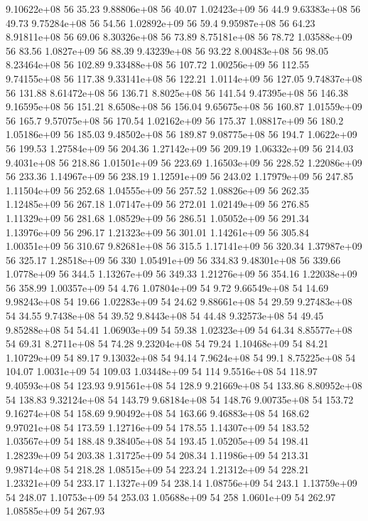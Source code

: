 9.10622e+08 56 35.23
9.88806e+08 56 40.07
1.02423e+09 56 44.9
9.63383e+08 56 49.73
9.75284e+08 56 54.56
1.02892e+09 56 59.4
9.95987e+08 56 64.23
8.91811e+08 56 69.06
8.30326e+08 56 73.89
8.75181e+08 56 78.72
1.03588e+09 56 83.56
1.0827e+09 56 88.39
9.43239e+08 56 93.22
8.00483e+08 56 98.05
8.23464e+08 56 102.89
9.33488e+08 56 107.72
1.00256e+09 56 112.55
9.74155e+08 56 117.38
9.33141e+08 56 122.21
1.0114e+09 56 127.05
9.74837e+08 56 131.88
8.61472e+08 56 136.71
8.8025e+08 56 141.54
9.47395e+08 56 146.38
9.16595e+08 56 151.21
8.6508e+08 56 156.04
9.65675e+08 56 160.87
1.01559e+09 56 165.7
9.57075e+08 56 170.54
1.02162e+09 56 175.37
1.08817e+09 56 180.2
1.05186e+09 56 185.03
9.48502e+08 56 189.87
9.08775e+08 56 194.7
1.0622e+09 56 199.53
1.27584e+09 56 204.36
1.27142e+09 56 209.19
1.06332e+09 56 214.03
9.4031e+08 56 218.86
1.01501e+09 56 223.69
1.16503e+09 56 228.52
1.22086e+09 56 233.36
1.14967e+09 56 238.19
1.12591e+09 56 243.02
1.17979e+09 56 247.85
1.11504e+09 56 252.68
1.04555e+09 56 257.52
1.08826e+09 56 262.35
1.12485e+09 56 267.18
1.07147e+09 56 272.01
1.02149e+09 56 276.85
1.11329e+09 56 281.68
1.08529e+09 56 286.51
1.05052e+09 56 291.34
1.13976e+09 56 296.17
1.21323e+09 56 301.01
1.14261e+09 56 305.84
1.00351e+09 56 310.67
9.82681e+08 56 315.5
1.17141e+09 56 320.34
1.37987e+09 56 325.17
1.28518e+09 56 330
1.05491e+09 56 334.83
9.48301e+08 56 339.66
1.0778e+09 56 344.5
1.13267e+09 56 349.33
1.21276e+09 56 354.16
1.22038e+09 56 358.99
1.00357e+09 54 4.76
1.07804e+09 54 9.72
9.66549e+08 54 14.69
9.98243e+08 54 19.66
1.02283e+09 54 24.62
9.88661e+08 54 29.59
9.27483e+08 54 34.55
9.7438e+08 54 39.52
9.8443e+08 54 44.48
9.32573e+08 54 49.45
9.85288e+08 54 54.41
1.06903e+09 54 59.38
1.02323e+09 54 64.34
8.85577e+08 54 69.31
8.2711e+08 54 74.28
9.23204e+08 54 79.24
1.10468e+09 54 84.21
1.10729e+09 54 89.17
9.13032e+08 54 94.14
7.9624e+08 54 99.1
8.75225e+08 54 104.07
1.0031e+09 54 109.03
1.03448e+09 54 114
9.5516e+08 54 118.97
9.40593e+08 54 123.93
9.91561e+08 54 128.9
9.21669e+08 54 133.86
8.80952e+08 54 138.83
9.32124e+08 54 143.79
9.68184e+08 54 148.76
9.00735e+08 54 153.72
9.16274e+08 54 158.69
9.90492e+08 54 163.66
9.46883e+08 54 168.62
9.97021e+08 54 173.59
1.12716e+09 54 178.55
1.14307e+09 54 183.52
1.03567e+09 54 188.48
9.38405e+08 54 193.45
1.05205e+09 54 198.41
1.28239e+09 54 203.38
1.31725e+09 54 208.34
1.11986e+09 54 213.31
9.98714e+08 54 218.28
1.08515e+09 54 223.24
1.21312e+09 54 228.21
1.23321e+09 54 233.17
1.1327e+09 54 238.14
1.08756e+09 54 243.1
1.13759e+09 54 248.07
1.10753e+09 54 253.03
1.05688e+09 54 258
1.0601e+09 54 262.97
1.08585e+09 54 267.93
